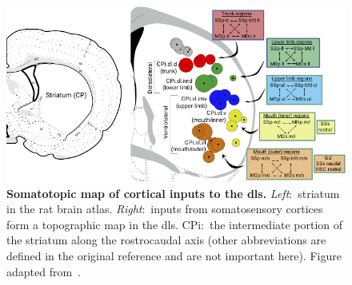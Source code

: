 \begin{figure}[bth!]
	\begin{center}
		\includegraphics[width=1\linewidth]{ch-intro/figures/StriatumInputMap}
		\caption[Map of Cortical Inputs to DLS]
		{\textbf{Somatotopic map of cortical inputs to the \gls{dls}.}
		\textit{Left}:~striatum in the rat brain atlas.
		\textit{Right}:~inputs from somatosensory cortices form a topographic map in the \gls{dls}.
		CPi:~the intermediate portion of the striatum along the rostrocaudal axis (other abbreviations are defined in the original reference and are not important here).
		Figure adapted from~\cite{Hintiryan2016NN}.
		}
		\label{fig:intro:InputMap}
	\end{center}
\end{figure}